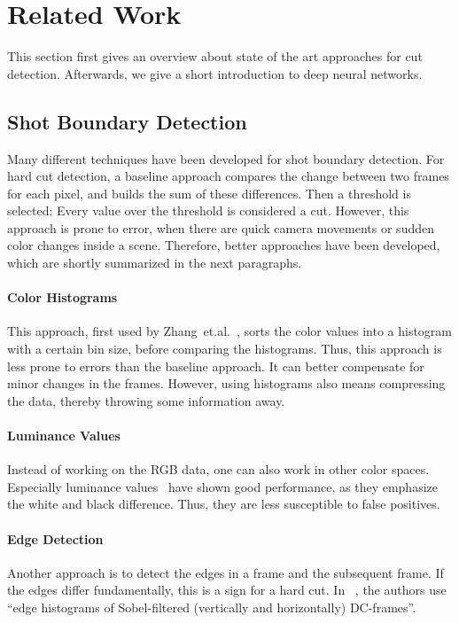 \section{Related Work}
\label{sec:related_work}

This section first gives an overview about state of the art approaches for cut detection.
Afterwards, we give a short introduction to deep neural networks.

\subsection{Shot Boundary Detection}

Many different techniques have been developed for shot boundary detection.
For hard cut detection, a baseline approach compares the change between two frames for each pixel, and builds the sum of these differences.
Then a threshold is selected: Every value over the threshold is considered a cut.
However, this approach is prone to error, when there are quick camera movements or sudden color changes inside a scene.
Therefore, better approaches have been developed, which are shortly summarized in the next paragraphs.

\paragraph{Color Histograms}
This approach, first used by Zhang~et.al.~\cite{zhang1993automatic}, sorts the color values into a histogram with a certain bin size, before comparing the histograms.
Thus, this approach is less prone to errors than the baseline approach.
It can better compensate for minor changes in the frames.
However, using histograms also means compressing the data, thereby throwing some information away.

\paragraph{Luminance Values}
Instead of working on the RGB data, one can also work in other color spaces.
Especially luminance values~\cite{petersohn2004fraunhofer} have shown good performance, as they emphasize the white and black difference.
Thus, they are less susceptible to false positives.

\paragraph{Edge Detection}
Another approach is to detect the edges in a frame and the subsequent frame.
If the edges differ fundamentally, this is a sign for a hard cut.
In ~\cite{ewerth2005university}, the authors use ``edge histograms of Sobel-filtered (vertically and horizontally) DC-frames''.

